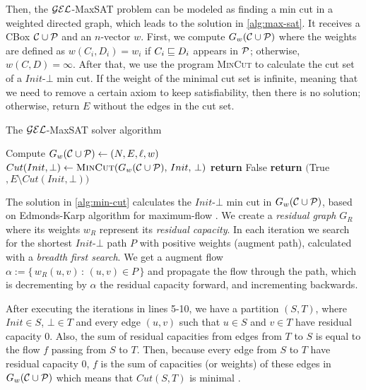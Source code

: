 Then, the $\mathcal{GEL}$-MaxSAT problem can be modeled as finding a min cut in a weighted directed graph, which leads to the solution in \cref{alg:max-sat}. It receives a CBox $\mathcal{C} \cup \mathcal{P}$ and an $n$-vector $w$. First, we compute $G_w(\mathcal{C} \cup \mathcal{P})$ where the weights are defined as $w(C_i, D_i) = w_i$ if $C_i \sqsubseteq D_i$ appears in $\mathcal{P}$; otherwise, $w(C, D) = \infty$. After that, we use the program \textsc{MinCut} to calculate the cut set of a $Init$-$\bot$ min cut. If the weight of the minimal cut set is infinite, meaning that we need to remove a certain axiom to keep satisfiability, then there is no solution; otherwise, return $E$ without the edges in the cut set.

\begin{algorithm}
	\caption{The $\mathcal{GEL}$-MaxSAT solver algorithm}
	\label{alg:max-sat}
	\begin{algorithmic}[1]
		\State Compute $G_w(\mathcal{C} \cup \mathcal{P}) \gets (N, E, \ell, w)$
		\State $Cut(Init, \bot) \gets \Call{MinCut}{G_w(\CC \cup \PP),\, Init,\, \bot}$
		\State \textbf{return} False
		\EndIf
		\Statex
		\State \textbf{return} $($True$, E \setminus Cut(Init, \bot))$
		\EndFunction
	\end{algorithmic}
\end{algorithm}

The solution in \cref{alg:min-cut} calculates the $Init$-$\bot$ min cut in $G_w(\mathcal{C} \cup \mathcal{P})$, based on Edmonds-Karp algorithm for maximum-flow \citep{cormen2009introduction}. We create a \emph{residual graph} $G_R$ where its weights $w_R$ represent its \emph{residual capacity}. In each iteration we search for the shortest $Init$-$\bot$ path $P$ with positive weights (augment path), calculated with a \emph{breadth first search}. We get a augment flow $\alpha := \{ \, w_R(u,v) \, : \, (u,v) \in P \, \}$ and propagate the flow through the path, which is decrementing by $\alpha$ the residual capacity forward, and incrementing backwards. 

After executing the iterations in lines 5-10, we have a partition $(S, T)$, where $Init \in S$, $\bot \in T$ and every edge $(u, v)$ such that $u \in S$ and $v \in T$ have residual capacity 0. Also, the sum of residual capacities from edges from $T$ to $S$ is equal to the flow $f$ passing from $S$ to $T$. Then, because every edge from $S$ to $T$ have residual capacity 0, $f$ is the sum of capacities (or weights) of these edges in $G_w(\mathcal{C} \cup \mathcal{P})$ which means that $Cut(S, T)$ is minimal \citep{ford1962flows}.

